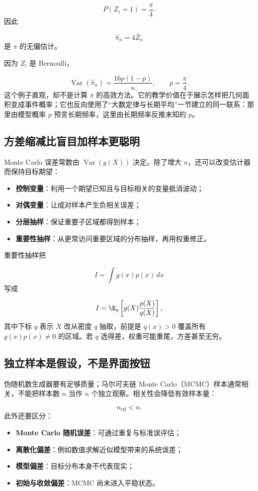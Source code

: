 \[
P(Z_i=1)=\frac{\pi}{4}.
\]
因此

\[
\widehat\pi_n
=4\bar Z_n
\]
是 $\pi$ 的无偏估计。

因为 $Z_i$ 是 Bernoulli，

\[
\operatorname{Var}(\widehat\pi_n)
=\frac{16p(1-p)}n,
\qquad p=\frac\pi4.
\]
这个例子直观，却不是计算 $\pi$ 的高效方法。它的教学价值在于展示怎样把几何面积变成事件概率；它也反向使用了``大数定律与长期平均''一节建立的同一联系：那里由模型概率 $p$ 预言长期频率，这里由长期频率反推未知的 $p$。

\subsection{方差缩减比盲目加样本更聪明}

Monte Carlo 误差常数由 $\operatorname{Var}(g(X))$ 决定。除了增大 $n$，还可以改变估计器而保持目标期望：

\begin{itemize}
\tightlist
\item
  \textbf{控制变量}：利用一个期望已知且与目标相关的变量抵消波动；
\item
  \textbf{对偶变量}：让成对样本产生负相关误差；
\item
  \textbf{分层抽样}：保证重要子区域都得到样本；
\item
  \textbf{重要性抽样}：从更常访问重要区域的分布抽样，再用权重修正。
\end{itemize}

重要性抽样把

\[
I=\int g(x)p(x)\,dx
\]
写成

\[
I=\E_q\left[
g(X)\frac{p(X)}{q(X)}
\right],
\]
其中下标 $q$ 表示 $X$ 改从密度 $q$ 抽取，前提是 $q(x)>0$ 覆盖所有 $g(x)p(x)\ne0$ 的区域。若 $q$ 选得差，权重可能重尾，方差甚至无穷。

\subsection{独立样本是假设，不是界面按钮}

伪随机数生成器要有足够质量；马尔可夫链 Monte Carlo（MCMC）样本通常相关，不能把样本数 $n$ 当作 $n$ 个独立观察。相关性会降低有效样本量：

\[
n_{\mathrm{eff}}<n.
\]
此外还要区分：

\begin{itemize}
\tightlist
\item
  \textbf{Monte Carlo 随机误差}：可通过重复与标准误评估；
\item
  \textbf{离散化偏差}：例如数值求解近似模型带来的系统误差；
\item
  \textbf{模型偏差}：目标分布本身不代表现实；
\item
  \textbf{初始与收敛偏差}：MCMC 尚未进入平稳状态。
\end{itemize}

